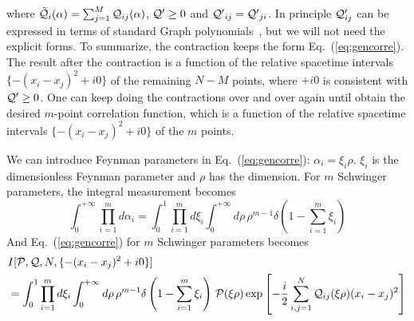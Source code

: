 \documentclass[a4paper,11pt]{article}
\begin{document}
where ${\cal \tilde{Q}}_{i}(\alpha)=\sum_{j=1}^{M} {\cal Q}_{ij}(\alpha)$, ${\cal Q'} \geq 0$ and ${\cal Q'}_{ij}={\cal Q'}_{ji}$. In principle ${\cal Q}'_{ij}$ can be expressed in terms of standard Graph polynomials~\cite{Bogner:2010kv}, but we will not need the explicit forms.  To summarize, the contraction keeps the form Eq.~(\ref{eq:gencorre}). The result after the contraction is a function of the relative spacetime intervals $\{-(x_i-x_j)^2+i0\}$ of the remaining $N-M$ points, where $+i0$ is consistent with ${\cal Q'} \geq 0$. One can keep doing the contractions over and over again until obtain the desired $m$-point correlation function, which is a function of the relative spacetime intervals $\{-(x_i-x_j)^2+i0\}$ of the $m$ points. %

We can introduce Feynman parameters in Eq.~(\ref{eq:gencorre}): $\alpha_i = \xi_i \rho$. $\xi_i$ is the dimensionless Feynman parameter and $\rho$ has the dimension.  
For $m$ Schwinger parameters, the integral measurement becomes $$\int_{0}^{+\infty} \prod_{i=1}^{m} d \alpha_i = \int_{0}^{1}\prod_{i=1}^{m} d \xi_i \int_{0}^{+\infty} d \rho \, \rho^{m-1} \delta\left(1-\sum_{i=1}^{m}\xi_i\right)$$
And Eq.~(\ref{eq:gencorre}) for $m$ Schwinger parameters becomes
\begin{align}\label{eq:gencorre2}
&I[{\cal P}, {\cal Q}, N, \{-(x_i-x_j)^2+i0\}] \nonumber\\
&= \int_{0}^{1}\prod_{i=1}^{m} d \xi_i \int_{0}^{+\infty} d \rho \, \rho^{m-1} \delta\left(1-\sum_{i=1}^{m}\xi_i\right) \, {\cal P}(\xi \rho) \exp\left[-\frac{i}{2} \sum_{i,j=1}^{N} {\cal Q}_{ij}(\xi \rho) (x_i-x_j)^2 \right]
\end{align}
\end{document}
